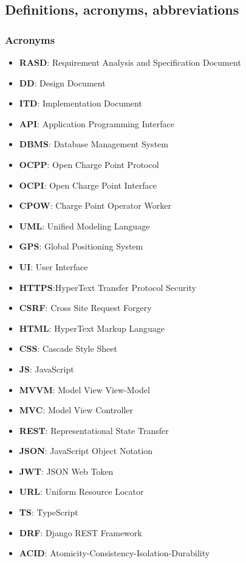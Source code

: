 \documentclass[table, 12pt]{article}
\begin{document}
\subsection{Definitions, acronyms, abbreviations}
\subsubsection*{Acronyms}
\begin{itemize}
    \item \textbf{RASD}: Requirement Analysis and Specification Document
    \item \textbf{DD}: Design Document
    \item \textbf{ITD}: Implementation Document
    \item \textbf{API}: Application Programming Interface
    \item \textbf{DBMS}: Database Management System
    \item \textbf{OCPP}: Open Charge Point Protocol
    \item \textbf{OCPI}: Open Charge Point Interface
    \item \textbf{CPOW}: Charge Point Operator Worker
    \item \textbf{UML}: Unified Modeling Language
    \item \textbf{GPS}: Global Positioning System
    \item \textbf{UI}: User Interface
    \item \textbf{HTTPS}:HyperText Transfer Protocol Security
    \item \textbf{CSRF}: Cross Site Request Forgery
    \item \textbf{HTML}: HyperText Markup Language
    \item \textbf{CSS}: Cascade Style Sheet
    \item \textbf{JS}: JavaScript
    \item \textbf{MVVM}: Model View View-Model
    \item \textbf{MVC}: Model View Controller
    \item \textbf{REST}: Representational State Transfer
    \item \textbf{JSON}: JavaScript Object Notation
    \item \textbf{JWT}: JSON Web Token
    \item \textbf{URL}: Uniform Resource Locator
    \item \textbf{TS}: TypeScript
    \item \textbf{DRF}: Django REST Framework
    \item \textbf{ACID}: Atomicity-Consistency-Isolation-Durability
\end{itemize}
\end{document}
